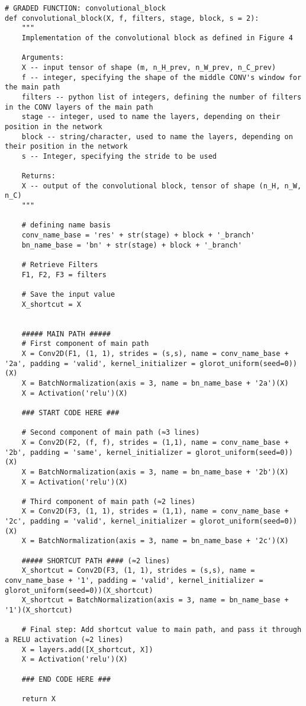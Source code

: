 \begin{verbatim}
# GRADED FUNCTION: convolutional_block
def convolutional_block(X, f, filters, stage, block, s = 2):
    """
    Implementation of the convolutional block as defined in Figure 4
    
    Arguments:
    X -- input tensor of shape (m, n_H_prev, n_W_prev, n_C_prev)
    f -- integer, specifying the shape of the middle CONV's window for the main path
    filters -- python list of integers, defining the number of filters in the CONV layers of the main path
    stage -- integer, used to name the layers, depending on their position in the network
    block -- string/character, used to name the layers, depending on their position in the network
    s -- Integer, specifying the stride to be used
    
    Returns:
    X -- output of the convolutional block, tensor of shape (n_H, n_W, n_C)
    """
    
    # defining name basis
    conv_name_base = 'res' + str(stage) + block + '_branch'
    bn_name_base = 'bn' + str(stage) + block + '_branch'
    
    # Retrieve Filters
    F1, F2, F3 = filters
    
    # Save the input value
    X_shortcut = X


    ##### MAIN PATH #####
    # First component of main path 
    X = Conv2D(F1, (1, 1), strides = (s,s), name = conv_name_base + '2a', padding = 'valid', kernel_initializer = glorot_uniform(seed=0))(X)
    X = BatchNormalization(axis = 3, name = bn_name_base + '2a')(X)
    X = Activation('relu')(X)
    
    ### START CODE HERE ###

    # Second component of main path (≈3 lines)
    X = Conv2D(F2, (f, f), strides = (1,1), name = conv_name_base + '2b', padding = 'same', kernel_initializer = glorot_uniform(seed=0))(X)
    X = BatchNormalization(axis = 3, name = bn_name_base + '2b')(X)
    X = Activation('relu')(X)

    # Third component of main path (≈2 lines)
    X = Conv2D(F3, (1, 1), strides = (1,1), name = conv_name_base + '2c', padding = 'valid', kernel_initializer = glorot_uniform(seed=0))(X)
    X = BatchNormalization(axis = 3, name = bn_name_base + '2c')(X)

    ##### SHORTCUT PATH #### (≈2 lines)
    X_shortcut = Conv2D(F3, (1, 1), strides = (s,s), name = conv_name_base + '1', padding = 'valid', kernel_initializer = glorot_uniform(seed=0))(X_shortcut)
    X_shortcut = BatchNormalization(axis = 3, name = bn_name_base + '1')(X_shortcut)

    # Final step: Add shortcut value to main path, and pass it through a RELU activation (≈2 lines)
    X = layers.add([X_shortcut, X])
    X = Activation('relu')(X)
    
    ### END CODE HERE ###
    
    return X
\end{verbatim}




